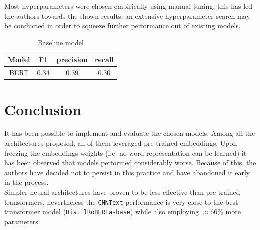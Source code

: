 \documentclass[11pt]{article}
\begin{document}
Most hyperparameters were chosen empirically using manual tuning, this has led the authors towards the shown results, an extensive hyperparameter search may be conducted in order to squeeze further performance out of existing models.

\begin{table}[!h]
\begin{center}
\begin{tabular}{ cccc } 
\hline
Model & F1 & precision & recall \\ \hline
{BERT} & 0.34 & 0.39 & 0.30 \\ 
\hline
\end{tabular}
\caption{\label{baseline} Baseline model\cite{Kiesel2022}}
\end{center}
\end{table}




\section{Conclusion}
\label{sec:conclusion}

It has been possible to implement and evaluate the chosen models. Among all the architectures proposed, all of them leveraged pre-trained embeddings. Upon freezing the embeddings weights (i.e. no word representation can be learned) it has been observed that models performed considerably worse. Because of this, the authors have decided not to persist in this practice and have abandoned it early in the process. \\

Simpler neural architectures have proven to be less effective than pre-trained transformers, nevertheless the \texttt{CNNText} performance is very close to the best transformer model (\texttt{DistilRoBERTa-base}) while also employing $\approx 66\%$ more parameters. \\
\end{document}
